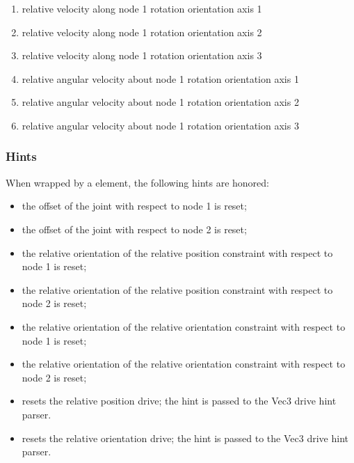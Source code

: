 \begin{enumerate}
\item {} relative velocity along node 1 rotation orientation axis 1
\item {} relative velocity along node 1 rotation orientation axis 2
\item {} relative velocity along node 1 rotation orientation axis 3

\item {} relative angular velocity about node 1 rotation orientation axis 1
\item {} relative angular velocity about node 1 rotation orientation axis 2
\item {} relative angular velocity about node 1 rotation orientation axis 3
\end{enumerate}

\subsubsection{Hints}
When wrapped by a  element, the following hints are honored:
\begin{itemize}
\item {} the offset of the joint
with respect to node 1 is reset;
\item {} the offset of the joint
with respect to node 2 is reset;
\item {} the relative orientation
of the relative position constraint with respect to node 1 is reset;
\item {} the relative orientation 
of the relative position constraint with respect to node 2 is reset;
\item {} the relative orientation
of the relative orientation constraint with respect to node 1 is reset;
\item {} the relative orientation 
of the relative orientation constraint with respect to node 2 is reset;
\item {} resets the relative position drive;
the hint is passed to the Vec3 drive hint parser.
\item {} resets the relative orientation drive;
the hint is passed to the Vec3 drive hint parser.
\end{itemize}



